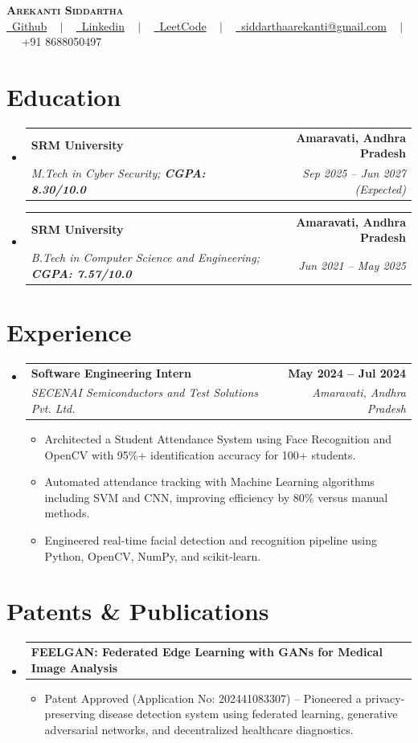 \documentclass[letterpaper,11pt]{article}
\makeatletter
\newcommand{\resumeItem}[1]{
  \item\small{
    {#1 \vspace{1pt}}
  }
}
\newcommand{\resumeSubheading}[4]{
  \vspace{-1pt}\item
    \begin{tabular*}{1.0\textwidth}[t]{l@{\extracolsep{\fill}}r}
      \textbf{#1} & \textbf{\small #2} \\
      \textit{\small#3} & \textit{\small #4} \\
    \end{tabular*}\vspace{-4pt}
}
\newcommand{\resumeProjectHeading}[2]{
    \item
    \begin{tabular*}{1.001\textwidth}{l@{\extracolsep{\fill}}r}
      \small#1 & \textbf{\small #2}\\
    \end{tabular*}\vspace{-4pt}
}
\newcommand{\resumeSubHeadingListStart}{\begin{itemize}[leftmargin=0.0in, label={}, itemsep=2.5pt, parsep=0pt, topsep=1.5pt, partopsep=0pt]}
\newcommand{\resumeSubHeadingListEnd}{\end{itemize}}
\newcommand{\resumeItemListStart}{\begin{itemize}[leftmargin=0.15in, itemsep=1.5pt, parsep=0pt, topsep=1.5pt, partopsep=0pt]}
\newcommand{\resumeItemListEnd}{\end{itemize}\vspace{-2pt}}
\makeatother
\begin{document}
\begin{center}
    \textbf{\Huge \scshape Arekanti Siddartha} \\ \vspace{2pt}
    \href{https://github.com/Siddartharekanti}{\raisebox{0\height}\faGithub\ {Github}}
    ~ $|$ ~ 
    \href{https://www.linkedin.com/in/siddartha-arekanti-05557b24b/}{\raisebox{0\height}\faLinkedin\ {Linkedin}}
    ~ $|$ ~ 
    \href{https://leetcode.com/u/Siddartha_A/}{\raisebox{0\height}\faCode\ {LeetCode}}
    ~ $|$ ~ 
    \href{mailto:siddarthaarekanti@gmail.com}{\raisebox{-0.1\height}\faEnvelope\  {siddarthaarekanti@gmail.com}}
    ~ $|$ ~ 
    \small \raisebox{-0.01\height}\faPhone\ +91 8688050497
    \vspace{-12pt}
\end{center}

\section{Education}
  \resumeSubHeadingListStart
    \resumeSubheading
      {SRM University}{Amaravati, Andhra Pradesh}
      {M.Tech in Cyber Security; \textbf{CGPA: 8.30/10.0}}{Sep 2025 -- Jun 2027 (Expected)}
    \resumeSubheading
      {SRM University}{Amaravati, Andhra Pradesh}
      {B.Tech in Computer Science and Engineering; \textbf{CGPA: 7.57/10.0}}{Jun 2021 -- May 2025}
  \resumeSubHeadingListEnd
\vspace{-14pt}

\section{Experience}
  \resumeSubHeadingListStart
    \resumeSubheading
      {Software Engineering Intern}{May 2024 -- Jul 2024}
      {SECENAI Semiconductors and Test Solutions Pvt. Ltd.}{Amaravati, Andhra Pradesh}
      \resumeItemListStart
        \resumeItem{Architected a Student Attendance System using Face Recognition and OpenCV with 95\%+ identification accuracy for 100+ students.}
        \resumeItem{Automated attendance tracking with Machine Learning algorithms including SVM and CNN, improving efficiency by 80\% versus manual methods.}
        \resumeItem{Engineered real-time facial detection and recognition pipeline using Python, OpenCV, NumPy, and scikit-learn.}
      \resumeItemListEnd
  \resumeSubHeadingListEnd
\vspace{-14pt}

\section{Patents \& Publications}
  \resumeSubHeadingListStart
    \resumeProjectHeading
        {\textbf{FEELGAN: Federated Edge Learning with GANs for Medical Image Analysis}}{}
        \resumeItemListStart
            \resumeItem{Patent Approved (Application No: 202441083307) -- Pioneered a privacy-preserving disease detection system using federated learning, generative adversarial networks, and decentralized healthcare diagnostics.}
        \resumeItemListEnd
  \resumeSubHeadingListEnd
\vspace{-14pt}
\end{document}
